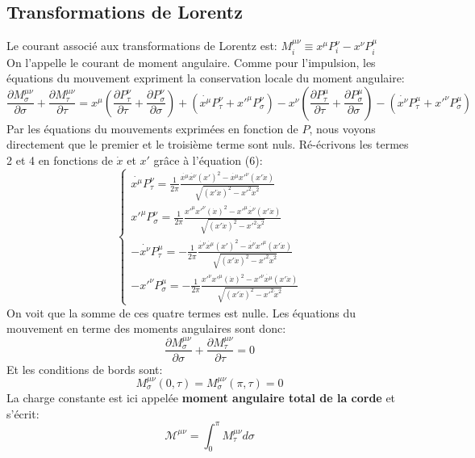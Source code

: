 \documentclass[a4paper,12pt]{article}
\def\xmu{x^\mu}
\begin{document}
\subsection{Transformations de Lorentz}
Le courant associé aux transformations de Lorentz est:
$M_{i}^{\mu\nu}\equiv x^{\mu}P^{\nu}_{i}-x^{\nu}P^{\mu}_{i}$\\
On l'appelle le courant de moment angulaire.
Comme pour l'impulsion, les équations du mouvement expriment la conservation locale du moment angulaire:
$$\frac{\partial M_{\sigma}^{\mu\nu}}{\partial \sigma}+\frac{\partial M_{\tau}^{\mu\nu}}{\partial \tau}=x^{\mu}\left( \frac{\partial P^{\nu}_{\tau}}{\partial \tau}+\frac{\partial P^{\nu}_{\sigma}}{\partial \sigma}\right) +\left( \dot{x^{\mu}}P^{\nu}_{\tau}+x'^{\mu}P^{\nu}_{\sigma}\right) -x^{\nu}\left( \frac{\partial P^{\mu}_{\tau}}{\partial \tau}+\frac{\partial P^{\mu}_{\sigma}}{\partial \sigma}\right) -\left( \dot{x^{\nu}}P^{\mu}_{\tau}+x'^{\nu}P^{\mu}_{\sigma}\right)$$
Par les équations du mouvements exprimées en fonction de $P$, nous voyons directement que le premier et le troisième terme sont nuls. 
Ré-écrivons les termes 2 et 4 en fonctions de $\dot{x}$ et $x'$ grâce à l'équation (6):
\begin{equation}
	\left\lbrace
	\begin{aligned}
	\dot{x^{\mu}}P^{\nu}_{\tau}=\frac{1}{2\pi}\frac{\dot{\xmu}\dot{x^\nu}(x')^2-\dot{\xmu}x'^\nu(x'\dot{x})}{\sqrt{(x'\dot{x})^2-x'^2\dot{x}^2}}\\
	x'^{\mu}P^{\nu}_{\sigma}=\frac{1}{2\pi}\frac{x'^\mu x'^\nu (\dot{x})^2-x'^{\mu}\dot{x^\nu}(x'\dot{x})}{\sqrt{(x'\dot{x})^2-x'^2\dot{x}^2}}\\
	-\dot{x^{\nu}}P^{\mu}_{\tau}=-\frac{1}{2\pi}\frac{\dot{x^\nu}\dot{\xmu}(x')^2-\dot{x^\nu}x'^\mu(x'\dot{x})}{\sqrt{(x'\dot{x})^2-x'^2\dot{x}^2}}\\
	-x'^{\nu}P^{\mu}_{\sigma}=-\frac{1}{2\pi}\frac{x'^{\nu}x'^\mu (\dot{x})^2-x'^{\nu}\dot{\xmu}(x'\dot{x})}{\sqrt{(x'\dot{x})^2-x'^2\dot{x}^2}}
	\end{aligned}
	\right.
\end{equation}
On voit que la somme de ces quatre termes est nulle. 
Les équations du mouvement en terme des moments angulaires sont donc:
$$\frac{\partial M_{\sigma}^{\mu\nu}}{\partial \sigma}+\frac{\partial M_{\tau}^{\mu\nu}}{\partial \tau}=0$$
Et les conditions de bords sont:
$$M_{\sigma}^{\mu\nu}(0,\tau)=M_{\sigma}^{\mu\nu}(\pi,\tau)=0$$
La charge constante est ici appelée \textbf{moment angulaire total de la corde} et s'écrit: 
$$\mathcal{M^{\mu\nu}}=\int_{0}^{\pi}M^{\mu\nu}_{\tau}d\sigma$$
\end{document}
